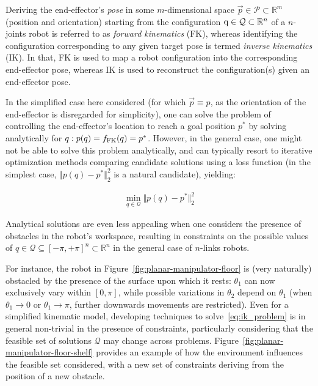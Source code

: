 Deriving the end-effector's \emph{pose} in some \(m\)-dimensional space \( \vec{p} \in \mathcal{P} \subset \mathbb{R}^{m} \) (position and orientation) starting from the configuration \( {\textnormal{q}} \in \mathcal Q \subset \mathbb R^n \) of a \( n \)-joints robot is referred to as \emph{forward kinematics} (FK), whereas identifying the configuration corresponding to any given target pose is termed \emph{inverse kinematics} (IK).
In that, FK is used to map a robot configuration into the corresponding end-effector pose, whereas IK is used to reconstruct the configuration(s) given an end-effector pose.

In the simplified case here considered (for which \( \vec{p} \equiv p \), as the orientation of the end-effector is disregarded for simplicity), one can solve the problem of controlling the end-effector's location to reach a goal position \( p^* \) by solving analytically for \( q: p(q) = f_{\text{FK}}(q) = p^*\).
However, in the general case, one might not be able to solve this problem analytically, and can typically resort to iterative optimization methods comparing candidate solutions using a loss function (in the simplest case, \( \Vert p(q) - p^* \Vert_2^2 \) is a natural candidate), yielding:

\begin{align}
\min_{q \in \mathcal Q} \Vert p(q) - p^* \Vert_2^2
\label{eq:ik_problem}
\end{align}

Analytical solutions are even less appealing when one considers the presence of obstacles in the robot's workspace, resulting in constraints on the possible values of \( q \in \mathcal Q \subseteq [-\pi, +\pi]^n \subset \mathbb R^n \) in the general case of \(n\)-links robots.

For instance, the robot in Figure~\ref{fig:planar-manipulator-floor} is (very naturally) obstacled by the presence of the surface upon which it rests: \( \theta_1 \) can now exclusively vary within \([0,  \pi] \), while possible variations in \( \theta_2 \) depend on \( \theta_1 \) (when \( \theta_1 \to 0 \) or \( \theta_1 \to \pi \), further downwards movements are restricted).
Even for a simplified kinematic model, developing techniques to solve~\ref{eq:ik_problem} is in general non-trivial in the presence of constraints, particularly considering that the feasible set of solutions \( \mathcal Q \) may change across problems.
Figure~\ref{fig:planar-manipulator-floor-shelf} provides an example of how the environment influences the feasible set considered, with a new set of constraints deriving from the position of a new obstacle.

